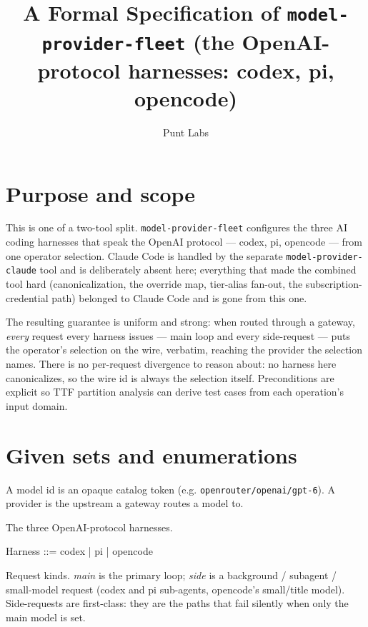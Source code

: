 \documentclass{article}
\begin{document}
\title{A Formal Specification of \texttt{model-provider-fleet} (the OpenAI-protocol harnesses: codex, pi, opencode)}
\author{Punt Labs}
\maketitle

\section{Purpose and scope}

This is one of a two-tool split. \texttt{model-provider-fleet} configures the
three AI coding harnesses that speak the OpenAI protocol --- codex, pi, opencode
--- from one operator selection. Claude Code is handled by the separate
\texttt{model-provider-claude} tool and is deliberately absent here; everything
that made the combined tool hard (canonicalization, the override map, tier-alias
fan-out, the subscription-credential path) belonged to Claude Code and is gone
from this one.

The resulting guarantee is uniform and strong: when routed through a gateway,
\emph{every} request every harness issues --- main loop and every side-request
--- puts the operator's selection on the wire, verbatim, reaching the provider
the selection names. There is no per-request divergence to reason about: no
harness here canonicalizes, so the wire id is always the selection itself.
Preconditions are explicit so TTF partition analysis can derive test cases from
each operation's input domain.

\section{Given sets and enumerations}

A model id is an opaque catalog token (e.g. \texttt{openrouter/openai/gpt-6}). A
provider is the upstream a gateway routes a model to.

\begin{zed}
\end{zed}

The three OpenAI-protocol harnesses.

\begin{zed}
  Harness ::= codex | pi | opencode
\end{zed}

Request kinds. \emph{main} is the primary loop; \emph{side} is a background /
subagent / small-model request (codex and pi sub-agents, opencode's small/title
model). Side-requests are first-class: they are the paths that fail silently
when only the main model is set.
\end{document}
